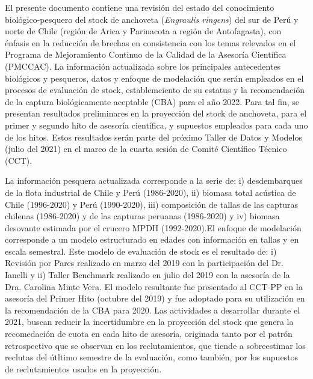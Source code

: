 \documentclass[letter,11pt]{article}
\begin{document}
El presente documento contiene una revisi\'on del estado del conocimiento
biol\'ogico-pesquero del stock de anchoveta (\textit{Engraulis ringens})
del sur de Per\'u y norte de Chile (regi\'on de Arica y Parinacota a regi\'on
de Antofagasta), con \'enfasis en la reducci\'on de brechas en consistencia
con los temas relevados en el Programa de Mejoramiento Continuo de la
Calidad de la Asesor\'ia Cient\'ifica (PMCCAC). La informaci\'on actualizada
sobre los principales antecedentes biol\'ogicos y pesqueros, datos y
enfoque de modelaci\'on que ser\'an empleados en el procesos de evaluaci\'on
de stock, establemciento de su estatus y la recomendaci\'on de la captura
biol\'ogicamente aceptable (CBA) para el a\~{n}o 2022. Para tal fin, se
presentan resultados preliminares en la proyecci\'on del stock de
anchoveta, para el primer y segundo hito de asesor\'ia cient\'ifica, y
supuestos empleados para cada uno de los hitos. Estos resultados ser\'an
parte del pr\'oximo Taller de Datos y Modelos (julio del 2021) en el marco
de la cuarta sesi\'on de Comit\'e Cient\'ifico T\'ecnico (CCT).

La informaci\'on pesquera actualizada corresponde a la serie de: i)
desdembarques de la flota industrial de Chile y Per\'u (1986-2020), ii)
biomasa total ac\'ustica de Chile (1996-2020) y Per\'u (1990-2020), iii)
composici\'on de tallas de las capturas chilenas (1986-2020) y de las
capturas peruanas (1986-2020) y iv) biomasa desovante estimada por el
crucero MPDH (1992-2020).El enfoque de modelaci\'on corresponde a un
modelo estructurado en edades con informaci\'on en tallas y en escala
semestral. Este modelo de evaluaci\'on de stock es el resultado de: i)
Revisi\'on por Pares realizado en marzo del 2019 con la participaci\'on del
Dr. Ianelli y ii) Taller Benchmark realizado en julio del 2019 con la
asesor\'ia de la Dra. Carolina Minte Vera. El modelo resultante fue
presentado al CCT-PP en la asesor\'ia del Primer Hito (octubre del 2019) y
fue adoptado para su utilizaci\'on en la recomendaci\'on de la CBA para
2020. Las actividades a desarrollar durante el 2021, buscan reducir la
incertidumbre en la proyecci\'on del stock que genera la recomedaci\'on de
cuota en cada hito de asesor\'ia, originada tanto por el patr\'on
retrospectivo que se observan en los reclutamientos, que tiende a
sobreestimar los reclutas del \'utltimo semestre de la evaluaci\'on, como
tambi\'en, por los supuestos de reclutamientos usados en la proyecci\'on.
\end{document}
